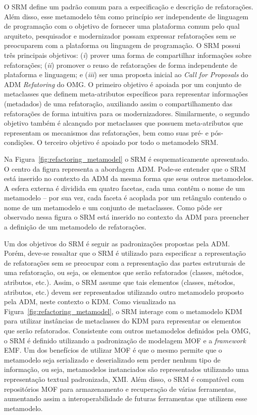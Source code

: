 O SRM define um padrão comum para a especificação e descrição de refatorações. Além disso, esse metamodelo têm como princípio ser independente de linguagem de programação com o objetivo de fornecer uma plataforma comum pelo qual arquiteto, pesquisador e modernizador possam expressar refatorações sem se preocuparem com a plataforma ou linguagem de programação. O SRM possui três principais objetivos: (\textit{i}) prover uma forma de compartilhar informações sobre refatorações; (\textit{ii}) promover o reuso de refatorações de forma independente de plataforma e linguagem; e (\textit{iii}) ser uma proposta inicial ao \textit{Call for Proposals} do ADM \textit{Refatoring} do OMG. O primeiro objetivo é apoiada por um conjunto de metaclasses que definem meta-atributos específicos para representar informações (metadados) de uma refatoração, auxiliando assim o compartilhamento das refatorações de forma intuitiva para os modernizadores. Similarmente, o segundo objetivo também é alcançado por metaclasses que possuem meta-atributos que representam os mecanismos das refatorações, bem como suas pré- e pós-condições. O terceiro objetivo é apoiado por todo o metamodelo SRM.
 
Na Figura~\ref{fig:refactoring_metamodel} o SRM é esquematicamente apresentado. O centro da figura representa a abordagem ADM. Pode-se entender que o SRM está inserido no contexto da ADM da mesma forma que seus outros metamodelos. A esfera externa é dividida em quatro facetas, cada uma contêm o nome de um metamodelo – por sua vez, cada faceta é acoplada por um retângulo contendo o nome de um metamodelo e um conjunto de metaclasses. Como pôde ser observado nessa figura o SRM está inserido no contexto da ADM para preencher a definição de um metamodelo de refatorações. 

Um dos objetivos do SRM é seguir as padronizações propostas pela ADM. Porém, deve-se ressaltar que o SRM é utilizado para especificar a representação de refatorações sem se preocupar com a representação das partes estruturais de uma refatoração, ou seja, os elementos que serão refatorados (classes, métodos, atributos, etc.). Assim, o SRM assume que tais elementos (classes, métodos, atributos, etc.) devem ser representados utilizando outro metamodelo proposto pela ADM, neste contexto o KDM. Como visualizado na Figura~\ref{fig:refactoring_metamodel}, o SRM interage com o metamodelo KDM para utilizar instâncias de metaclasses do KDM para representar os elementos que serão refatorados. Consistente com outros metamodelos definidos pela OMG, o SRM é definido utilizando a padronização de modelagem MOF e a \textit{framework} EMF. Um dos benefícios de utilizar MOF é que o mesmo permite que o metamodelo seja serializado e deserializado sem perder nenhum tipo de informação, ou seja, metamodelos instanciados são representados utilizando uma representação textual padronizada, XMI. Além disso, o SRM é compatível com repositórios MOF para armazenamento e recuperação de várias ferramentas, aumentando assim a interoperabilidade de futuras ferramentas que utilizem esse metamodelo.

